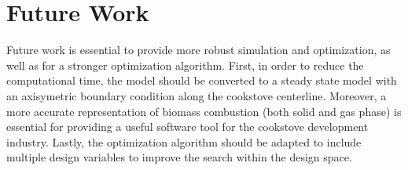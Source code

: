 \documentclass[3p,times,twocolumn]{elsarticle}
\begin{document}
\section{Future Work}
Future work is essential to provide more robust simulation and optimization, as well as for a stronger optimization algorithm. First, in order to reduce the computational time, the model should be converted to a steady state model with an axisymetric boundary condition along the cookstove centerline. Moreover, a more accurate representation of biomass combustion (both solid and gas phase) is essential for providing a useful software tool for the cookstove development industry. Lastly, the optimization algorithm should be adapted to include multiple design variables to improve the search within the design space.

















\end{document}
